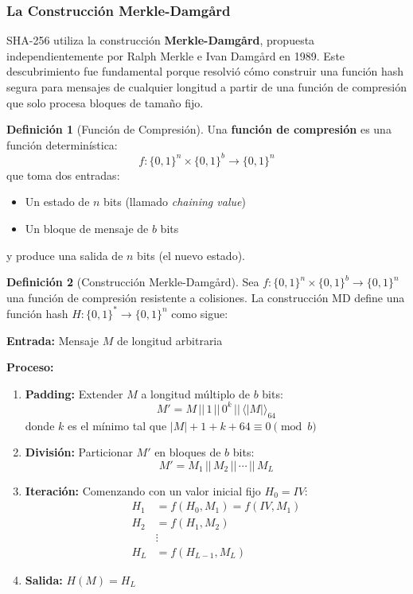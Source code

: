 \documentclass[11pt,a4paper,twoside,openright]{book}
\theoremstyle{definition}
\newtheorem{definition}{Definición}[chapter]
\theoremstyle{plain}
\theoremstyle{remark}
\begin{document}
\subsubsection{La Construcción Merkle-Damgård}

SHA-256 utiliza la construcción \textbf{Merkle-Damgård}, propuesta independientemente por Ralph Merkle e Ivan Damgård en 1989. Este descubrimiento fue fundamental porque resolvió cómo construir una función hash segura para mensajes de cualquier longitud a partir de una función de compresión que solo procesa bloques de tamaño fijo.

\begin{definition}[Función de Compresión]
Una \textbf{función de compresión} es una función determinística:
\[ f: \{0,1\}^n \times \{0,1\}^b \to \{0,1\}^n \]
que toma dos entradas:
\begin{itemize}
    \item Un estado de $n$ bits (llamado \textit{chaining value})
    \item Un bloque de mensaje de $b$ bits
\end{itemize}
y produce una salida de $n$ bits (el nuevo estado).
\end{definition}

\begin{definition}[Construcción Merkle-Damgård]
Sea $f: \{0,1\}^n \times \{0,1\}^b \to \{0,1\}^n$ una función de compresión resistente a colisiones. La construcción MD define una función hash $H: \{0,1\}^* \to \{0,1\}^n$ como sigue:

\textbf{Entrada:} Mensaje $M$ de longitud arbitraria

\textbf{Proceso:}
\begin{enumerate}
    \item \textbf{Padding:} Extender $M$ a longitud múltiplo de $b$ bits:
    \[ M' = M \,||\, 1 \,||\, 0^k \,||\, \langle |M| \rangle_{64} \]
    donde $k$ es el mínimo tal que $|M| + 1 + k + 64 \equiv 0 \pmod{b}$
    
    \item \textbf{División:} Particionar $M'$ en bloques de $b$ bits:
    \[ M' = M_1 \,||\, M_2 \,||\, \cdots \,||\, M_L \]
    
    \item \textbf{Iteración:} Comenzando con un valor inicial fijo $H_0 = IV$:
    \begin{align}
        H_1 &= f(H_0, M_1) = f(IV, M_1) \\
        H_2 &= f(H_1, M_2) \\
        &\vdots \\
        H_L &= f(H_{L-1}, M_L)
    \end{align}
    
    \item \textbf{Salida:} $H(M) = H_L$
\end{enumerate}
\end{definition}
\end{document}
